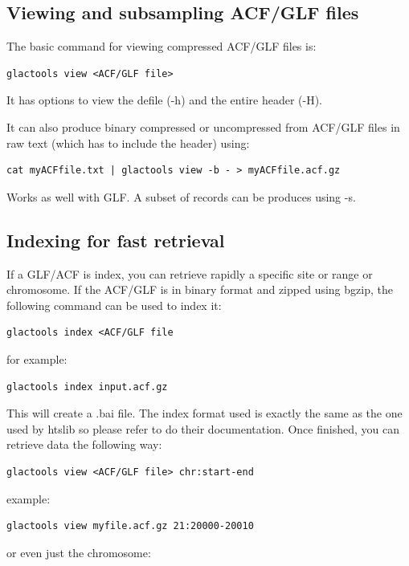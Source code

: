 \documentclass[a4paper]{article}
\begin{document}
\subsection{Viewing and subsampling ACF/GLF files }

The basic command for viewing compressed ACF/GLF files is:

\begin{lstlisting}
glactools view <ACF/GLF file>
\end{lstlisting}

It has options to view the defile (-h) and the entire header (-H).

It can also produce binary compressed or uncompressed from ACF/GLF files in raw text (which has to include the header) using:
\begin{lstlisting}
cat myACFfile.txt | glactools view -b - > myACFfile.acf.gz
\end{lstlisting}
Works as well with GLF. A subset of records can be produces using -s.


\subsection{Indexing for fast retrieval}
\label{sec:indexing}
If a GLF/ACF is index, you can retrieve rapidly a specific site or range or chromosome. If the ACF/GLF is in binary format and zipped using bgzip, the following command can be used to index it:





\begin{lstlisting}
glactools index <ACF/GLF file
\end{lstlisting}

for example:
\begin{lstlisting}
glactools index input.acf.gz
\end{lstlisting}

This will create a .bai file. The index format used is exactly the same as the one used by htslib so please refer to do their documentation. Once finished, you can retrieve data the following way:

\begin{lstlisting}
glactools view <ACF/GLF file> chr:start-end
\end{lstlisting}

example:
\begin{lstlisting}
glactools view myfile.acf.gz 21:20000-20010
\end{lstlisting}
or even just the chromosome:
\end{document}
